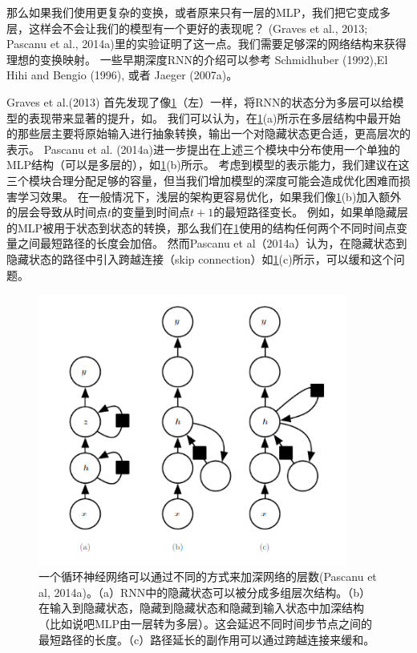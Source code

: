 那么如果我们使用更复杂的变换，或者原来只有一层的MLP，我们把它变成多层，这样会不会让我们的模型有一个更好的表现呢？
 (Graves et al., 2013; Pascanu et al., 2014a)里的实验证明了这一点。我们需要足够深的网络结构来获得理想的变换映射。 一些早期深度RNN的介绍可以参考 Schmidhuber (1992),El Hihi and Bengio (1996), 或者 Jaeger (2007a)。
 
 Graves et al.(2013) 首先发现了像\ref{fig:10_13}（左）一样，将RNN的状态分为多层可以给模型的表现带来显著的提升，如。
我们可以认为，在\ref{fig:10_13}(a)所示在多层结构中最开始的那些层主要将原始输入进行抽象转换，输出一个对隐藏状态更合适，更高层次的表示。
Pascanu et al. (2014a)进一步提出在上述三个模块中分布使用一个单独的MLP结构（可以是多层的），如\ref{fig:10_13}(b)所示。
考虑到模型的表示能力，我们建议在这三个模块合理分配足够的容量，但当我们增加模型的深度可能会造成优化困难而损害学习效果。
在一般情况下，浅层的架构更容易优化，如果我们像\ref{fig:10_13}(b)加入额外的层会导致从时间点$t$的变量到时间点$t+1$的最短路径变长。
例如，如果单隐藏层的MLP被用于状态到状态的转换，那么我们在\ref{fig:10_13}使用的结构任何两个不同时间点变量之间最短路径的长度会加倍。
然而Pascanu et al（2014a）认为，在隐藏状态到隐藏状态的路径中引入跨越连接（skip connection）如\ref{fig:10_13}(c)所示，可以缓和这个问题。

 \begin{figure}[htbp] %
   \centering
   \includegraphics[width=4in]{fig/chap10/10_13.PNG} 
   \caption{一个循环神经网络可以通过不同的方式来加深网络的层数(Pascanu et al, 2014a)。（a）RNN中的隐藏状态可以被分成多组层次结构。（b）在输入到隐藏状态，隐藏到隐藏状态和隐藏到输入状态中加深结构（比如说吧MLP由一层转为多层）。这会延迟不同时间步节点之间的最短路径的长度。（c）路径延长的副作用可以通过跨越连接来缓和。}
   \label{fig:10_13}
\end{figure}

